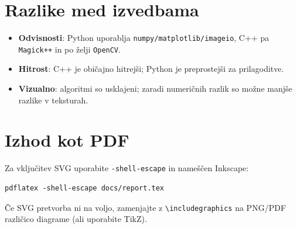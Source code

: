 \documentclass[11pt,a4paper]{article}
\begin{document}
\section{Razlike med izvedbama}
\begin{itemize}[noitemsep]
  \item \textbf{Odvisnosti}: Python uporablja \texttt{numpy/matplotlib/imageio}, C++ pa \texttt{Magick++} in po želji \texttt{OpenCV}.
  \item \textbf{Hitrost}: C++ je običajno hitrejši; Python je preprostejši za prilagoditve.
  \item \textbf{Vizualno}: algoritmi so usklajeni; zaradi numeričnih razlik so možne manjše razlike v teksturah.
\end{itemize}

\section{Izhod kot PDF}
Za vključitev SVG uporabite \texttt{-shell-escape} in nameščen Inkscape:
\begin{verbatim}
pdflatex -shell-escape docs/report.tex
\end{verbatim}
Če SVG pretvorba ni na voljo, zamenjajte \verb|| z \verb|\includegraphics| na PNG/PDF različico diagrame (ali uporabite TikZ).
\end{document}
